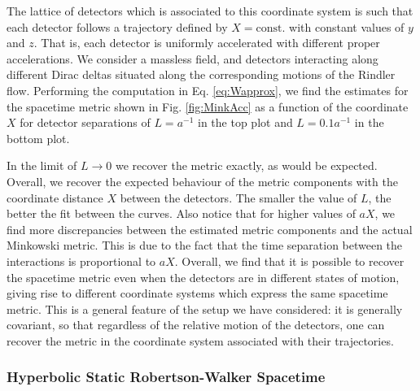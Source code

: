 \documentclass[letterpaper,12pt,titlepage,oneside,final]{book}
\begin{document}
    
    The lattice of detectors which is associated to this coordinate system is such that each detector follows a trajectory defined by $X = \text{const.}$ with constant values of $y$ and $z$. That is, each detector is uniformly accelerated with different proper accelerations. We consider a massless field, and detectors interacting along different Dirac deltas situated along the corresponding motions of the Rindler flow. Performing the computation in Eq. \eqref{eq:Wapprox}, we find the estimates for the spacetime metric shown in Fig. \ref{fig:MinkAcc} as a function of the coordinate $X$ for detector separations of $L = a^{-1}$ in the top plot and $L = 0.1 a^{-1}$ in the bottom plot. 

    In the limit of $L \to 0$ we recover the metric exactly, as would be expected. Overall, we recover the expected behaviour of the metric components with the coordinate distance $X$ between the detectors. The smaller the value of $L$, the better the fit between the curves. Also notice that for higher values of $aX$, we find more discrepancies between the estimated metric components and the actual Minkowski metric. This is due to the fact that the time separation between the interactions is proportional to $aX$. Overall, we find that it is possible to recover the spacetime metric even when the detectors are in different states of motion, giving rise to different coordinate systems which express the same spacetime metric. This is a general feature of the setup we have considered: it is generally covariant, so that regardless of the relative motion of the detectors, one can recover the metric in the coordinate system associated with their trajectories.
    
    
    \subsubsection*{Hyperbolic Static Robertson-Walker Spacetime}
    
\end{document}
